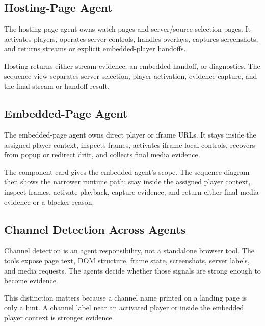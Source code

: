 
\FloatBarrier
\clearpage

\subsection{Hosting-Page Agent}

The hosting-page agent owns watch pages and server/source selection pages.
It activates players, operates server controls, handles overlays, captures
screenshots, and returns streams or explicit embedded-player handoffs.



Hosting returns either stream evidence, an embedded handoff, or diagnostics.
The sequence view separates server selection, player activation, evidence
capture, and the final stream-or-handoff result.


\FloatBarrier
\clearpage

\subsection{Embedded-Page Agent}

The embedded-page agent owns direct player or iframe URLs.
It stays inside the assigned player context, inspects frames, activates
iframe-local controls, recovers from popup or redirect drift, and collects final
media evidence.



The component card gives the embedded agent's scope. The sequence diagram then
shows the narrower runtime path: stay inside the assigned player context, inspect
frames, activate playback, capture evidence, and return either final media
evidence or a blocker reason.


\FloatBarrier
\clearpage

\subsection{Channel Detection Across Agents}

Channel detection is an agent responsibility, not a standalone browser tool. The
tools expose page text, DOM structure, frame state, screenshots, server labels, and
media requests. The agents decide whether those signals are strong enough to become
evidence.

This distinction matters because a channel name printed on a landing page is only a
hint. A channel label near an activated player or inside the embedded player context is
stronger evidence.

